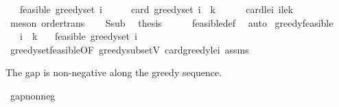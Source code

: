 \begin{isabellebody}
\ \ \ {\isachardoublequoteopen}feasible\ {\isacharparenleft}{\kern0pt}greedy{\isacharunderscore}{\kern0pt}set\ i{\isacharparenright}{\kern0pt}{\isachardoublequoteclose}\isanewline
%
\isadelimproof
%
\endisadelimproof
%
\isatagproof
{}\isamarkupfalse%
\ {\isacharminus}{\kern0pt}\isanewline
\ \ \isamarkupfalse%
\ {\isachardoublequoteopen}card\ {\isacharparenleft}{\kern0pt}greedy{\isacharunderscore}{\kern0pt}set\ i{\isacharparenright}{\kern0pt}\ {\isasymle}\ k{\isachardoublequoteclose}\isanewline
\ \ \ \ \isamarkupfalse%
\ card{\isacharunderscore}{\kern0pt}le{\isacharunderscore}{\kern0pt}i\ i{\isacharunderscore}{\kern0pt}le{\isacharunderscore}{\kern0pt}k\ \isamarkupfalse%
\ {\isacharparenleft}{\kern0pt}meson\ order{\isacharunderscore}{\kern0pt}trans{\isacharparenright}{\kern0pt}\isanewline
\ \ \isamarkupfalse%
\ S{\isacharunderscore}{\kern0pt}sub\ \isamarkupfalse%
\ {\isacharquery}{\kern0pt}thesis\isanewline
\ \ \ \ \isamarkupfalse%
\ feasible{\isacharunderscore}{\kern0pt}def\ \isamarkupfalse%
\ auto\isanewline
{}\isamarkupfalse%
%
\endisatagproof
{\isafoldproof}%
%
\isadelimproof
\isanewline
%
\endisadelimproof
\isanewline
{}\isamarkupfalse%
\ greedy{\isacharunderscore}{\kern0pt}feasible{\isacharcolon}{\kern0pt}\isanewline
\ \ \ {\isachardoublequoteopen}i\ {\isasymle}\ k{\isachardoublequoteclose}\isanewline
\ \ \ {\isachardoublequoteopen}feasible\ {\isacharparenleft}{\kern0pt}greedy{\isacharunderscore}{\kern0pt}set\ i{\isacharparenright}{\kern0pt}{\isachardoublequoteclose}\isanewline
%
\isadelimproof
\ \ %
\endisadelimproof
%
\isatagproof
{}\isamarkupfalse%
\ greedy{\isacharunderscore}{\kern0pt}set{\isacharunderscore}{\kern0pt}feasible{\isacharbrackleft}{\kern0pt}OF\ greedy{\isacharunderscore}{\kern0pt}subset{\isacharunderscore}{\kern0pt}V\ card{\isacharunderscore}{\kern0pt}greedy{\isacharunderscore}{\kern0pt}le{\isacharunderscore}{\kern0pt}i\ assms{\isacharbrackright}{\kern0pt}\ \isakeywordONE{{\isachardot}{\kern0pt}}\isamarkupfalse%
%
\endisatagproof
{\isafoldproof}%
%
\isadelimproof
%
\endisadelimproof
%
\begin{isamarkuptext}%
The gap is non-negative along the greedy sequence.%
\end{isamarkuptext}\isamarkuptrue%
\isamarkupfalse%
\ gap{\isacharunderscore}{\kern0pt}nonneg{\isacharcolon}{\kern0pt}\isanewline

\end{isabellebody}
